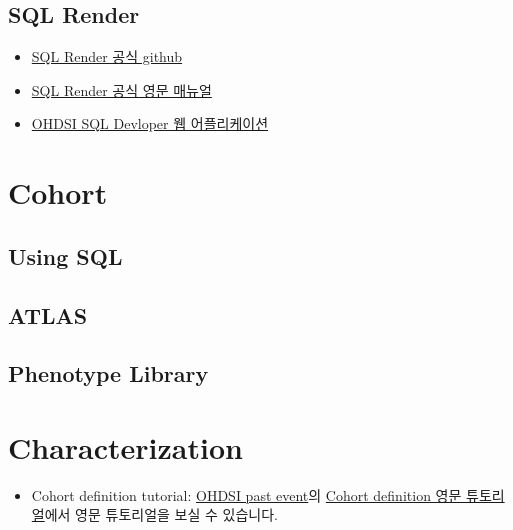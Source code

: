 \documentclass[]{book}
\providecommand{\tightlist}{%
  \setlength{\itemsep}{0pt}\setlength{\parskip}{0pt}}
\begin{document}
\hypertarget{sql-render}{%
\section{SQL Render}\label{sql-render}}

\begin{itemize}
\tightlist
\item
  \href{https://github.com/ohdsi/sqlrender}{SQL Render 공식 github}
\item
  \href{https://ohdsi.github.io/SqlRender/reference/index.html}{SQL Render 공식 영문 매뉴얼}
\item
  \href{http://data.ohdsi.org/SqlDeveloper/}{OHDSI SQL Devloper 웹 어플리케이션}
\end{itemize}

\hypertarget{cohort}{%
\chapter{Cohort}\label{cohort}}

\hypertarget{using-sql}{%
\section{Using SQL}\label{using-sql}}

\hypertarget{atlas}{%
\section{ATLAS}\label{atlas}}

\hypertarget{phenotype-library}{%
\section{Phenotype Library}\label{phenotype-library}}

\hypertarget{characterization}{%
\chapter{Characterization}\label{characterization}}

\begin{itemize}
\tightlist
\item
  Cohort definition tutorial: \href{https://www.ohdsi.org/past-events/}{OHDSI past event}의 \href{https://www.ohdsi.org/past-events/cohort-definitionphenotyping-tutorial/}{Cohort definition 영문 튜토리얼}에서 영문 튜토리얼을 보실 수 있습니다.
\end{itemize}
\end{document}
